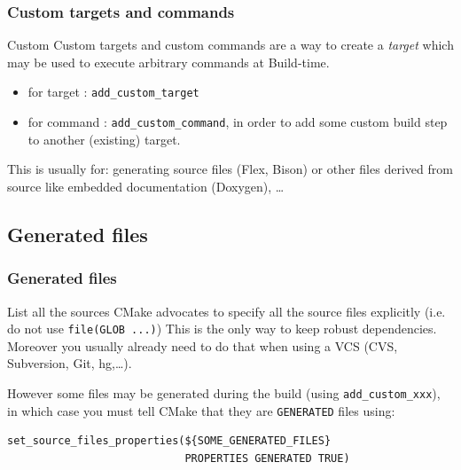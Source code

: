 \documentclass[compress,slidestop,table
              ]
               {beamer}
\begin{document}
\begin{frame}[fragile]
\frametitle{Custom targets and commands}
\begin{block}{Custom}
Custom targets and custom commands are a way to create a \emph{target}
which may be used to execute arbitrary commands at \alert{Build-time}.
\vspace*{0.4cm}
\begin{itemize}
\item for target  : \lstinline!add_custom_target!
\item for command : \lstinline!add_custom_command!, in order to add some
custom build step to another (existing) target.
\end{itemize}
\end{block}
This is usually for: generating source files (Flex, Bison) or
other files derived from source like embedded documentation (Doxygen), \ldots
\end{frame}

\subsection{Generated files}
\begin{frame}[fragile]
\frametitle{Generated files}
\begin{block}{List all the sources}
CMake advocates to specify all the source files explicitly
(i.e. do not use \lstinline!file(GLOB ...)!)
This is the only way to keep robust dependencies.
Moreover you usually already need to do that when using a VCS
(CVS, Subversion, Git, hg,\ldots).
\end{block}
However some files may be generated during the build (using \lstinline!add_custom_xxx!),
in which case you must tell CMake that they are \lstinline!GENERATED! files
using:

\begin{lstlisting}[basicstyle=\scriptsize]
set_source_files_properties(${SOME_GENERATED_FILES}
                            PROPERTIES GENERATED TRUE)
\end{lstlisting}
\end{frame}

\end{document}
